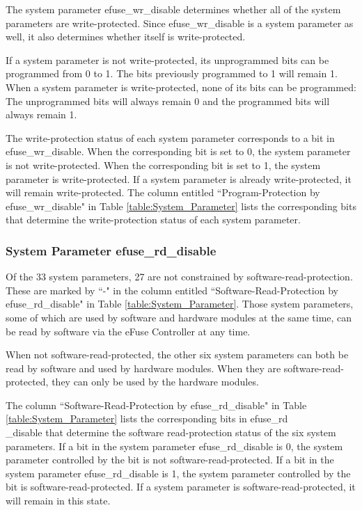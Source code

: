 \documentclass[main\_\_EN.tex]{subfiles}
\begin{document}
The system parameter efuse\_wr\_disable determines whether all of the system parameters are write-protected. Since efuse\_wr\_disable is a system parameter as well, it also determines whether itself is write-protected.

If a system parameter is not write-protected, its unprogrammed bits can be programmed from 0 to 1. The bits previously programmed to 1 will remain 1. When a system parameter is write-protected, none of its bits can be programmed: The unprogrammed bits will always remain 0 and the programmed bits will always remain 1.

The write-protection status of each system parameter corresponds to a bit in efuse\_wr\_disable. When the corresponding bit is set to 0, the system parameter is not write-protected. When the corresponding bit is set to 1, the system parameter is write-protected. If a system parameter is already write-protected, it will remain write-protected.
The column entitled ``Program-Protection by efuse\_wr\_disable" in Table \ref{table:System_Parameter} lists the corresponding bits that determine the write-protection status of each system parameter.

\subsubsection{System Parameter efuse\_rd\_disable}

Of the 33 system parameters, 27 are not constrained by software-read-protection. These are marked by ``-" in the column entitled ``Software-Read-Protection by efuse\_rd\_disable" in Table
\ref{table:System_Parameter}. Those system parameters, some of which are used by software and hardware modules at the same time, can be read by software via the eFuse Controller at any time.

When not software-read-protected, the other six system parameters can both be read by software and used by hardware modules. When they are software-read-protected, they can only be used by the hardware modules.

The column ``Software-Read-Protection by efuse\_rd\_disable" in Table \ref{table:System_Parameter} lists the corresponding bits in efuse\_rd\\\_disable that determine the software read-protection status of the six system parameters. If a bit in the system parameter efuse\_rd\_disable is 0, the system parameter controlled by the bit is not software-read-protected. If a bit in the system parameter efuse\_rd\_disable is 1, the system parameter controlled by the bit is software-read-protected. If a system parameter is software-read-protected, it will remain in this state.
\end{document}

